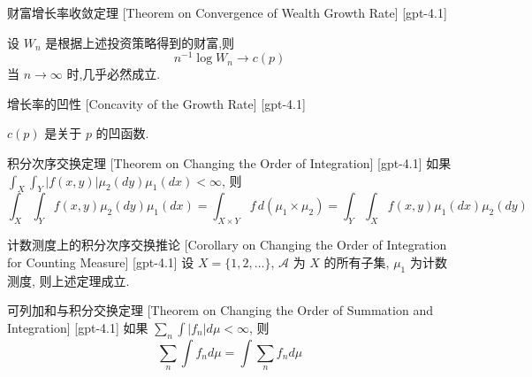 \documentclass[UTF8]{ctexart}
\begin{document}
    
    
    \begin{thm}
        {财富增长率收敛定理}
        [Theorem on Convergence of Wealth Growth Rate]
        [gpt-4.1]
        
设 $W_n$ 是根据上述投资策略得到的财富,则
\[
n^{-1} \log W_n \to c(p)
\]
当 $n \to \infty$ 时,几乎必然成立.

    \end{thm}
    
    
    
    \begin{ppt}
        {增长率的凹性}
        [Concavity of the Growth Rate]
        [gpt-4.1]
        
$c(p)$ 是关于 $p$ 的凹函数.

    \end{ppt}
    
    
    
    \begin{thm}
        {积分次序交换定理}
        [Theorem on Changing the Order of Integration]
        [gpt-4.1]
        如果 $\int_{X} \int_{Y} |f(x, y)| \mu_2(dy) \mu_1(dx) < \infty$, 则
\[
\int_{X} \int_{Y} f(x, y) \mu_2(dy) \mu_1(dx) = \int_{X \times Y} f \, d(\mu_1 \times \mu_2) = \int_{Y} \int_{X} f(x, y) \mu_1(dx) \mu_2(dy)
\]

    \end{thm}
    
    
    
    \begin{crl}
        {计数测度上的积分次序交换推论}
        [Corollary on Changing the Order of Integration for Counting Measure]
        [gpt-4.1]
        设 $X = \{1, 2, \ldots\}$, $\mathcal{A}$ 为 $X$ 的所有子集, $\mu_1$ 为计数测度, 则上述定理成立.
    \end{crl}
    
    
    
    \begin{thm}
        {可列加和与积分交换定理}
        [Theorem on Changing the Order of Summation and Integration]
        [gpt-4.1]
        如果 $\sum_{n} \int |f_n| d\mu < \infty$, 则
\[
\sum_{n} \int f_n d\mu = \int \sum_{n} f_n d\mu
\]

    \end{thm}
    
\end{document}
